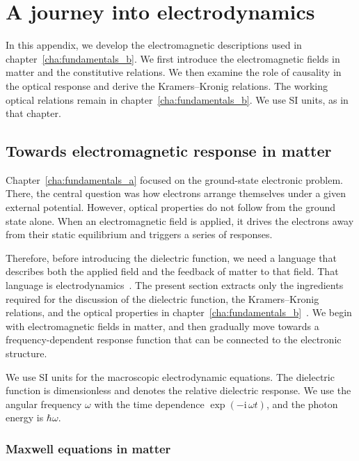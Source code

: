 \chapter{A journey into electrodynamics}
\label{cha:appendix_electrodynamics}

In this appendix, we develop the electromagnetic descriptions used in chapter~\ref{cha:fundamentals_b}.
We first introduce the electromagnetic fields in matter and the constitutive relations.
We then examine the role of causality in the optical response and derive the Kramers--Kronig relations.
The working optical relations remain in chapter~\ref{cha:fundamentals_b}.
We use SI units, as in that chapter.

\newpage
\FloatBarrier
\section{Towards electromagnetic response in matter}
\label{sec:toward_electromagnetic_response_in_matter}

Chapter~\ref{cha:fundamentals_a} focused on the ground-state electronic problem.
There, the central question was how electrons arrange themselves under a given external potential.
However, optical properties do not follow from the ground state alone.
When an electromagnetic field is applied,
it drives the electrons away from their static equilibrium and triggers a series of responses.

Therefore, before introducing the dielectric function, we need a language that describes both the applied field and the feedback of matter to that field.
That language is electrodynamics~\cite{jackson1999classical}.
The present section extracts only the ingredients required for the discussion of the dielectric function, the Kramers--Kronig relations, and the optical properties in chapter~\ref{cha:fundamentals_b}~\cite{landau2013electrodynamics,griffiths2023introduction}.
We begin with electromagnetic fields in matter, and then gradually move towards a frequency-dependent response function that can be connected to the electronic structure.

We use SI units for the macroscopic electrodynamic equations.
The dielectric function is dimensionless and denotes the relative dielectric response.
We use the angular frequency $\omega$ with the time dependence $\exp(-\mathrm{i}\,\omega t)$,
and the photon energy is $\hbar\omega$.

\FloatBarrier
\subsection{Maxwell equations in matter}

